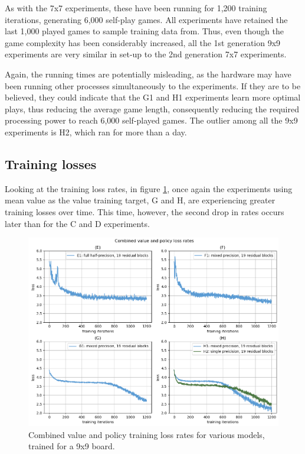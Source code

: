 As with the 7x7 experiments, these have been running for 1,200 training iterations, generating 6,000 self-play games. All experiments have retained the last 1,000 played games to sample training data from. Thus, even though the game complexity has been considerably increased, all the 1st generation 9x9 experiments are very similar in set-up to the 2nd generation 7x7 experiments.

Again, the running times are potentially misleading, as the hardware may have been running other processes simultaneously to the experiments. If they are to be believed, they could indicate that the G1 and H1 experiments learn more optimal plays, thus reducing the average game length, consequently reducing the required processing power to reach 6,000 self-played games. The outlier among all the 9x9 experiments is H2, which ran for more than a day.

\subsection{Training losses}
Looking at the training loss rates, in figure \ref{fig-loss-9}, once again the experiments using mean value as the value training target, G and H, are experiencing greater training losses over time. This time, however, the second drop in rates occurs later than for the C and D experiments. 

\begin{figure}[ht]
	\centering
	\includegraphics[width=1\textwidth]{figures/lossrates-9x9}
	\caption{Combined value and policy training loss rates for various models, trained for a 9x9 board.}
	\label{fig-loss-9}
\end{figure}

